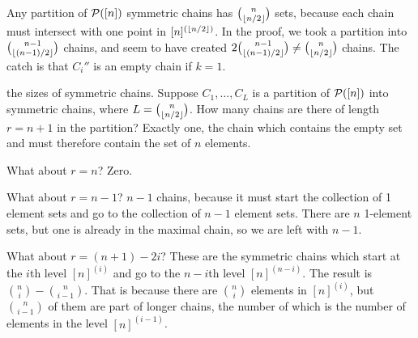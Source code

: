Any partition of $\P([n])$ symmetric chains has ${n\choose \floor{n/2}}$ sets, because each chain must intersect with one point in $[n]^{(\floor{n/2})}$.
In the proof, we took a partition into ${n-1 \choose \floor{(n-1)/2}}$ chains, and seem to have created $2 {n-1 \choose \floor{(n-1)/2}} \neq {n\choose \floor{n/2}}$ chains. The catch is that $C_i''$ is an empty chain if $k=1$.


 the sizes of symmetric chains. Suppose $C_1,\dotsc,C_L$ is a partition of $\P([n])$ into symmetric chains, where $L = {n\choose \floor{n/2}}$. How many chains are there of length $r=n+1$ in the partition? Exactly one, the chain which contains the empty set and must therefore contain the set of $n$ elements.

What about $r=n$? Zero.

What about $r= n-1$? $n-1$ chains, because it must start the collection of 1 element sets and go to the collection of $n-1$ element sets. There are $n$ 1-element sets, but one is already in the maximal chain, so we are left with $n-1$.

What about $r= (n+1)-2i$? These are the symmetric chains which start at the $i$th level $[n]^{(i)}$ and go to the $n-i$th level $[n]^{(n-i)}$. The result is ${n\choose i} - {n\choose i-1}$. That is because there are ${n\choose i}$ elements in $[n]^{(i)}$, but ${n\choose i-1}$ of them are part of longer chains, the number of which is the number of elements in the level $[n]^{(i-1)}$.

